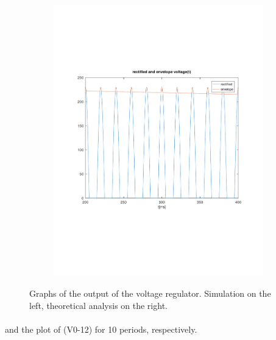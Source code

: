 \begin{figure}[h]
\begin{subfigure}{0.23\textwidth}
        \includegraphics[width=1.5\linewidth, clip]{../mat/envmat.pdf}
        \label{fig:PSciclo}
    \end{subfigure}

    \caption{\small Graphs of the output of the voltage regulator. Simulation on the left, theoretical analysis on the right.}
    \label{maquina}
\end{figure}
\vspace{1mm}
\paragraph{} and the plot of (V0-12) for 10 periods, respectively.

